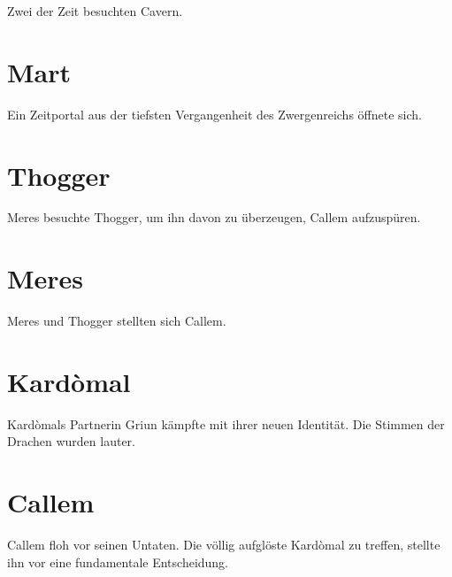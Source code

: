 Zwei  der Zeit besuchten Cavern.







\newpage
\section{Mart}

Ein Zeitportal aus der tiefsten Vergangenheit des Zwergenreichs öffnete sich.








\newpage
\section{Thogger}


Meres besuchte Thogger, um ihn davon zu überzeugen, Callem aufzuspüren.









\newpage
\section{Meres}


Meres und Thogger stellten sich Callem.






\newpage
\section{Kardòmal}



Kardòmals Partnerin Griun kämpfte mit ihrer neuen Identität. Die Stimmen der Drachen wurden lauter.












\newpage
\section{Callem}


Callem floh vor seinen Untaten. Die völlig aufglöste Kardòmal zu treffen, stellte ihn vor eine fundamentale Entscheidung.











